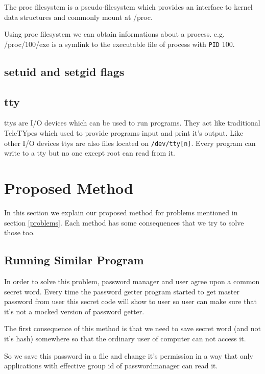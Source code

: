 \documentclass[journal]{IEEEtran}
\begin{document}
The proc filesystem is a pseudo-filesystem which provides an interface to kernel data structures and commonly mount at /proc. \cite{linuxman:proc}

Using proc filesystem we can obtain informations about a process. e.g. /proc/100/exe is a symlink to the executable file of process with \texttt{PID} 100.

\subsection{setuid and setgid flags}



\subsection{tty}

ttys are I/O devices which can be used to run programs. They act like traditional TeleTYpes which used to provide programs input and print it's output. Like other I/O devices ttys are also files located on \texttt{/dev/tty[n]}. Every program can write to a tty but no one except root can read from it. 

\section{Proposed Method}

In this section we explain our proposed method for problems mentioned in section \ref{problems}. Each method has some consequences that we try to solve those too.


\subsection{Running Similar Program}

In order to solve this problem, password manager and user agree upon a common secret word. Every time the password getter program started to get master password from user this secret code 
will show to user so user can make sure that it's not a mocked version of password getter.


The first consequence of this method is that we need to save secret word (and not it's hash) somewhere so that the ordinary user of computer can not access it. 

So we save this password in a file and change it's permission in a way that only applications with effective group id of passwordmanager can read it.
\end{document}
